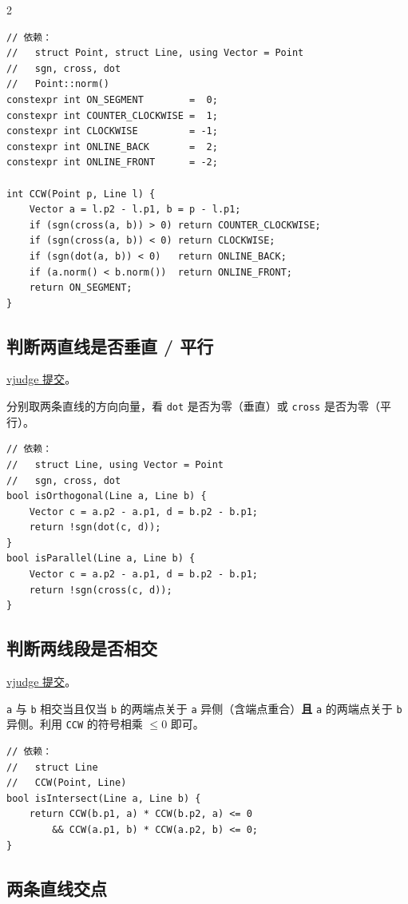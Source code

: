 \begin{multicols*}{2}
		\begin{verbatim}
// 依赖：
//   struct Point, struct Line, using Vector = Point
//   sgn, cross, dot
//   Point::norm()
constexpr int ON_SEGMENT        =  0;
constexpr int COUNTER_CLOCKWISE =  1;
constexpr int CLOCKWISE         = -1;
constexpr int ONLINE_BACK       =  2;
constexpr int ONLINE_FRONT      = -2;

int CCW(Point p, Line l) {
	Vector a = l.p2 - l.p1, b = p - l.p1;
	if (sgn(cross(a, b)) > 0) return COUNTER_CLOCKWISE;
	if (sgn(cross(a, b)) < 0) return CLOCKWISE;
	if (sgn(dot(a, b)) < 0)   return ONLINE_BACK;
	if (a.norm() < b.norm())  return ONLINE_FRONT;
	return ON_SEGMENT;
}
		\end{verbatim}

		\subsection{判断两直线是否垂直 / 平行}

		\href{https://vjudge.net/solution/64175524}{vjudge 提交}。

		分别取两条直线的方向向量，看 \texttt{dot} 是否为零（垂直）或 \texttt{cross} 是否为零（平行）。

		\begin{verbatim}
// 依赖：
//   struct Line, using Vector = Point
//   sgn, cross, dot
bool isOrthogonal(Line a, Line b) {
	Vector c = a.p2 - a.p1, d = b.p2 - b.p1;
	return !sgn(dot(c, d));
}
bool isParallel(Line a, Line b) {
	Vector c = a.p2 - a.p1, d = b.p2 - b.p1;
	return !sgn(cross(c, d));
}
		\end{verbatim}

		\subsection{判断两线段是否相交}

		\href{https://vjudge.net/solution/64175810}{vjudge 提交}。

		\texttt{a} 与 \texttt{b} 相交当且仅当 \texttt{b} 的两端点关于 \texttt{a} 异侧（含端点重合）\textbf{且} \texttt{a} 的两端点关于 \texttt{b} 异侧。利用 \texttt{CCW} 的符号相乘 $\le 0$ 即可。

		\begin{verbatim}
// 依赖：
//   struct Line
//   CCW(Point, Line)
bool isIntersect(Line a, Line b) {
	return CCW(b.p1, a) * CCW(b.p2, a) <= 0
	    && CCW(a.p1, b) * CCW(a.p2, b) <= 0;
}
		\end{verbatim}

		\subsection{两条直线交点}


\end{multicols*}
